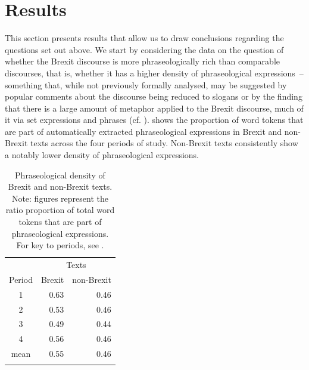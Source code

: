 \documentclass[output=paper]{langscibook}
\begin{document}
\section{Results}

This section presents results that allow us to draw conclusions regarding the questions set out above. We start by considering the data on the question of whether the Brexit discourse is more phraseologically rich than comparable discourses, that is, whether it has a higher density of phraseological expressions~-- something that, while not previously formally analysed, may be suggested by popular comments about the discourse being reduced to slogans or by the finding that there is a large amount of metaphor applied to the Brexit discourse, much of it via set expressions and phrases (cf. \citealt[2]{Charteris-Black2019}).  shows the proportion of word tokens that are part of automatically extracted phraseological expressions in Brexit and non-Brexit texts across the four periods of study. Non-Brexit texts consistently show a notably lower density of phraseological expressions.


\begin{table}
\begin{tabular}{crr}
\lsptoprule
       & \multicolumn{2}{c}{Texts}\\\cmidrule(lr){2-3}
Period & Brexit & non-Brexit\\\midrule
1    & 0.63 & 0.46\\
2    & 0.53 & 0.46\\
3    & 0.49 & 0.44\\
4    & 0.56 & 0.46\\
mean & 0.55 & 0.46\\
\lspbottomrule
\end{tabular}
\caption{Phraseological density of Brexit and non-Brexit texts. Note: figures represent the ratio proportion of total word tokens that are part of phraseological expressions. For key to periods, see .\label{tab:buerki:2}}
\end{table}
\end{document}
